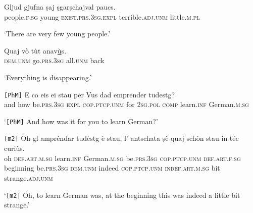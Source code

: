 \begin{linenumbers}
	\gll    Gljud gjufna ṣaj ṣgarṣchajval paucs.\\
	people.\textsc{f.sg} young \textsc{exist.prs.3sg.expl} terrible.\textsc{adj.unm} little.\textsc{m.pl}  \\
\end{linenumbers}
\medskip
\glt `There are very few young people.'
\medskip

\begin{linenumbers}
	\gll    Quaj vò tùt anav\underline{ù}s.\\
	\textsc{dem.unm} go.\textsc{prs.3sg} all.\textsc{unm} back \\
\end{linenumbers}
\medskip
\glt `Everything is disappearing.'
\medskip

\begin{linenumbers}
	\gll    \texttt{[PhM]} E co eis ei stau per Vus dad emprender tudestg?\\
	{} and how be.\textsc{prs.3sg} \textsc{expl} \textsc{cop.ptcp.unm} for \textsc{2sg.pol} \textsc{comp} learn.\textsc{inf} German.\textsc{m.sg} \\
\end{linenumbers}
\medskip
\glt `\texttt{[PhM]} And how was it for you to learn German?'
\medskip

\begin{linenumbers}
	\gll \texttt{[m2]} Òh gl ampréndar tudèstg è stau, l’ antschata ṣè quaj schòn stau in téc curiùs.\\
	{} oh \textsc{def.art.m.sg} learn.\textsc{inf} German.\textsc{m.sg} be.\textsc{prs.3sg}  \textsc{cop.ptcp.unm} \textsc{def.art.f.sg} beginning be.\textsc{prs.3sg} \textsc{dem.unm} indeed \textsc{cop.ptcp.unm} \textsc{indef.art.m.sg} bit strange.\textsc{adj.unm}\\
\end{linenumbers}
\medskip
\glt `\texttt{[m2]} Oh, to learn German was, at the beginning this was indeed a little bit strange.'
\medskip

